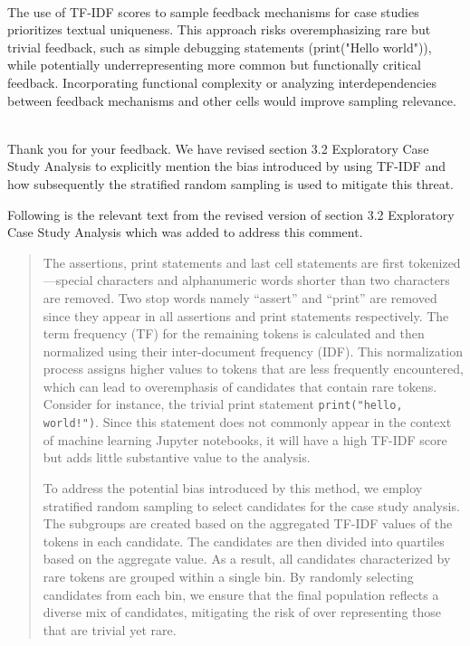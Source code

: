 \documentclass[11pt,fleqn]{article}
\newcommand{\eline}{\vspace*{.75\baselineskip}}
\newcommand{\Referee}[1]{\eline \noindent {\bf Reviewer comment #1:} \\}
\newcommand{\Us}{\eline \noindent {\bf Response:}\\}
\newenvironment{revcomment}[1][]
{\Referee{#1}\begin{rcomment}}
{\end{rcomment}}
\begin{document}
\begin{revcomment}[2.5]
  The use of TF-IDF scores to sample feedback mechanisms for case studies prioritizes textual uniqueness. This approach risks overemphasizing rare but trivial feedback, such as simple debugging statements (print("Hello world")), while potentially underrepresenting more common but functionally critical feedback. Incorporating functional complexity or analyzing interdependencies between feedback mechanisms and other cells would improve sampling relevance.
\end{revcomment}

\Us Thank you for your feedback. We have revised section 3.2 Exploratory Case Study Analysis to explicitly mention the bias introduced by using TF-IDF and how subsequently the stratified random sampling is used to mitigate this threat.

Following is the relevant text from the revised version of section 3.2 Exploratory Case Study Analysis which was added to address this comment.

\begin{quote}
  The assertions, print statements and last cell statements are first tokenized---special characters and alphanumeric words shorter than two characters are removed. Two stop words namely ``assert'' and ``print'' are removed since they appear in all assertions and print statements respectively. The term frequency (TF) for the remaining tokens is calculated and then normalized using their inter-document frequency (IDF). This normalization process assigns higher values to tokens that are less frequently encountered, which can lead to overemphasis of candidates that contain rare tokens. Consider for instance, the trivial print statement \texttt{print("hello, world!")}. Since this statement does not commonly appear in the context of machine learning Jupyter notebooks, it will have a high TF-IDF score but adds little substantive value to the analysis.

  To address the potential bias introduced by this method, we employ stratified random sampling to select candidates for the case study analysis. The subgroups are created based on the aggregated TF-IDF values of the tokens in each candidate. The candidates are then divided into quartiles based on the aggregate value. As a result, all candidates characterized by rare tokens are grouped within a single bin. By randomly selecting candidates from each bin, we ensure that the final population reflects a diverse mix of candidates, mitigating the risk of over representing those that are trivial yet rare.
\end{quote}
\end{document}
